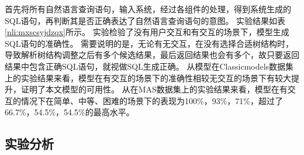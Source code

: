 首先将所有自然语言查询语句，输入系统，经过各组件的处理，得到系统生成的SQL语句，再判断其是否正确表达了自然语言查询语句的意图。
实验结果如表\ref{nli:mxscsyjdzqx}所示。
实验检验了没有用户交互和有交互的场景下，模型生成SQL语句的准确性。
需要说明的是，无论有无交互，在没有选择合适树结构时，导致解析树结构调整之后有多个候选结果，最后返回结果也会有多个，故只要返回结果中包含正确SQL语句，就视做SQL生成正确。
从模型在Classicmodels数据集上的实验结果来看，模型在有交互的场景下的准确性相较无交互的场景下有较大提升，证明了本文模型的可用性。
从在MAS数据集上的实验结果来看，模型在有交互的情况下在简单、中等、困难的场景下的表现为100\%，93\%，71\%，超过了66.7\%，54.5\%，54.5\%的最高水平\cite{simitsis2008precis}。



\subsection{实验分析}
